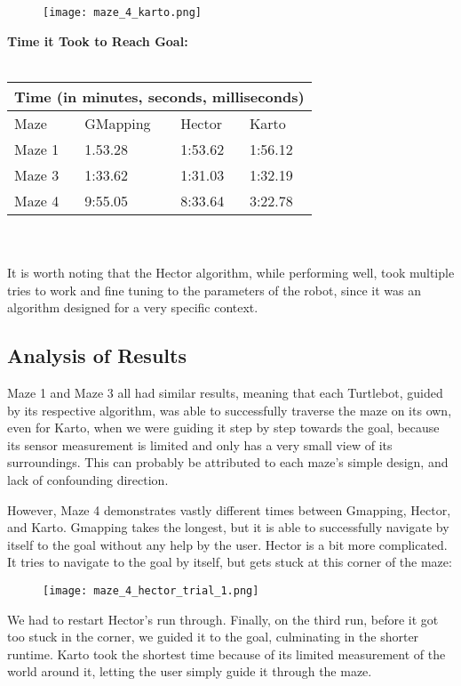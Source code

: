 \documentclass{article}
\begin{document}
\begin{figure}[htbp]
    \centering
    \texttt{[image: maze\_4\_karto.png]} 
\end{figure}

{\bf Time it Took to Reach Goal:} \\\\
\begin{tabular}{ |p{3cm}||p{3cm}|p{3cm}|p{3cm}|  }
 \hline
 \multicolumn{4}{|c|}{Time (in minutes, seconds, milliseconds)} \\
 \hline
 Maze & GMapping &Hector & Karto\\
 \hline
 Maze 1   & 1.53.28    &1:53.62&   1:56.12\\
 Maze 3 &  1:33.62  & 1:31.03   &1:32.19\\
 Maze 4  &9:55.05 & 8:33.64&  3:22.78\\
 \hline
\end{tabular}
\\
\\
It is worth noting that the Hector algorithm, while performing well, took multiple tries to work and fine tuning to the parameters of the robot, since it was an algorithm designed for a very specific context. 

\subsection{Analysis of Results}
Maze 1 and Maze 3 all had similar results, meaning that each Turtlebot, guided by its respective algorithm, was able to successfully traverse the maze on its own, even for Karto, when we were guiding it step by step towards the goal, because its sensor measurement is limited and only has a very small view of its surroundings. This can probably be attributed to each maze's simple design, and lack of confounding direction. 

However, Maze 4 demonstrates vastly different times between Gmapping, Hector, and Karto. Gmapping takes the longest, but it is able to successfully navigate by itself to the goal without any help by the user. Hector is a bit more complicated. It tries to navigate to the goal by itself, but gets stuck at this corner of the maze: 
\pagebreak

\begin{figure}[htbp]
    \centering
    \texttt{[image: maze\_4\_hector\_trial\_1.png]} 
\end{figure}


We had to restart Hector's run through. Finally, on the third run, before it got too stuck in the corner, we guided it to the goal, culminating in the shorter runtime. Karto took the shortest time because of its limited measurement of the world around it, letting the user simply guide it through the maze. 
\end{document}
